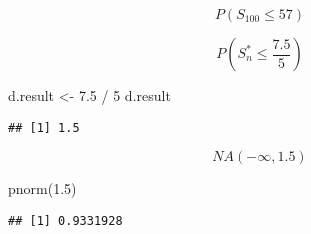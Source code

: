 \documentclass[
]{article}
\newenvironment{Shaded}{\begin{snugshade}}{\end{snugshade}}
\newcommand{\DecValTok}[1]{\textcolor[rgb]{0.00,0.00,0.81}{#1}}
\newcommand{\FloatTok}[1]{\textcolor[rgb]{0.00,0.00,0.81}{#1}}
\newcommand{\FunctionTok}[1]{\textcolor[rgb]{0.00,0.00,0.00}{#1}}
\newcommand{\NormalTok}[1]{#1}
\newcommand{\OtherTok}[1]{\textcolor[rgb]{0.56,0.35,0.01}{#1}}
\newcommand{\SpecialCharTok}[1]{\textcolor[rgb]{0.00,0.00,0.00}{#1}}
\begin{document}
\[
P(S_{100}\leq 57)
\]

\[
 P(S^*_{n}\leq \frac{7.5}{5})
\]

\begin{Shaded}
\begin{Highlighting}[]
\NormalTok{d.result }\OtherTok{\textless{}{-}} \FloatTok{7.5} \SpecialCharTok{/} \DecValTok{5}
\NormalTok{d.result}
\end{Highlighting}
\end{Shaded}

\begin{verbatim}
## [1] 1.5
\end{verbatim}

\[
NA(- \infty, 1.5)
\]

\begin{Shaded}
\begin{Highlighting}[]
\FunctionTok{pnorm}\NormalTok{(}\FloatTok{1.5}\NormalTok{)}
\end{Highlighting}
\end{Shaded}

\begin{verbatim}
## [1] 0.9331928
\end{verbatim}
\end{document}
